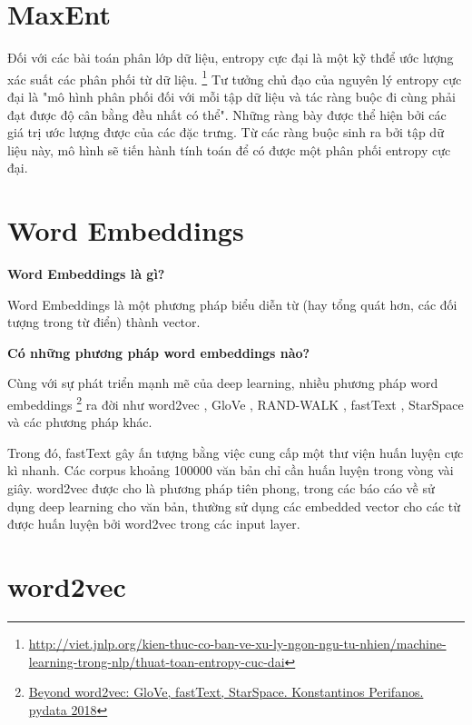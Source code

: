 \documentclass[11pt,a4paper]{article}
\begin{document}
\section{MaxEnt}

Đối với các bài toán phân lớp dữ liệu, entropy cực đại là một kỹ thđể ước lượng xác suất các phân phối từ dữ liệu.
\footnote{\href{http://viet.jnlp.org/kien-thuc-co-ban-ve-xu-ly-ngon-ngu-tu-nhien/machine-learning-trong-nlp/thuat-toan-entropy-cuc-dai}{http://viet.jnlp.org/kien-thuc-co-ban-ve-xu-ly-ngon-ngu-tu-nhien/machine-learning-trong-nlp/thuat-toan-entropy-cuc-dai}}
Tư tưởng chủ đạo của nguyên lý entropy cực đại là "mô hình phân phối đối với mỗi tập dữ liệu và tác ràng buộc đi cùng phải đạt được độ cân bằng đều nhất có thể".
Những ràng bày được thể hiện bởi các giá trị ước lượng được của các đặc trưng. Từ các ràng buộc sinh ra bởi tập dữ liệu này, mô hình sẽ tiến hành tính toán để có được một phân phối entropy cực đại.

\section{Word Embeddings}

\textbf{Word Embeddings là gì?}

Word Embeddings là một phương pháp biểu diễn từ (hay tổng quát hơn, các đối tượng trong từ điển) thành vector.

\textbf{Có những phương pháp word embeddings nào?}

Cùng với sự phát triển mạnh mẽ của deep learning, nhiều phương pháp word embeddings \footnote{\href{https://pydata.org/london2018/schedule/presentation/29/}{Beyond word2vec: GloVe, fastText, StarSpace. Konstantinos Perifanos. pydata 2018}} ra đời như word2vec \cite{DBLP:conf/nips/MikolovSCCD13}, GloVe \cite{DBLP:conf/emnlp/PenningtonSM14}, RAND-WALK \cite{DBLP:journals/corr/AroraLLMR15}, fastText \cite{DBLP:conf/eacl/GraveMJB17}, StarSpace \cite{DBLP:conf/aaai/WuFCABW18} và các phương pháp khác.

Trong đó, fastText gây ấn tượng bằng việc cung cấp một thư viện huấn luyện cực kì nhanh. Các corpus khoảng 100000 văn bản chỉ cần huấn luyện trong vòng vài giây. word2vec được cho là phương pháp tiên phong, trong các báo cáo về sử dụng deep learning cho văn bản, thường sử dụng các embedded vector cho các từ được huấn luyện bởi word2vec trong các input layer.

\section{word2vec}
\end{document}
